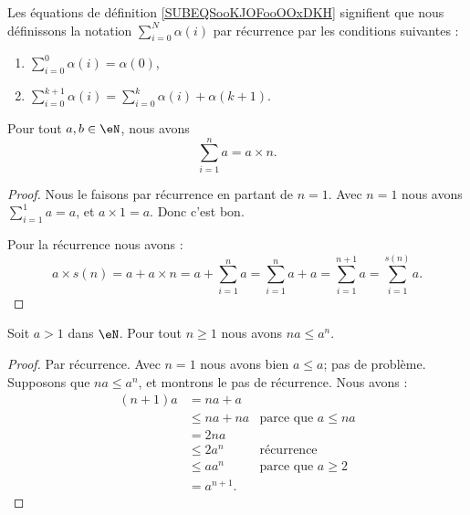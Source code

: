 \begin{normaltext}	\label{NORooNotationSommeNaturels}
	Les équations de définition \eqref{SUBEQSooKJOFooOOxDKH} signifient que nous définissons la notation \( \sum_{i=0}^N\alpha(i)\) par récurrence par les conditions suivantes :
	\begin{enumerate}
		\item       \label{ITEMooIPDTooEhOxea}
		      \( \sum_{i=0}^0\alpha(i)=\alpha(0)\),
		\item	\label{ITEMooSommeNaturelsSucc}
		      \( \sum_{i=0}^{k+1}\alpha(i)=\sum_{i=0}^{k}\alpha(i)+\alpha(k+1)\).
	\end{enumerate}
\end{normaltext}


\begin{proposition}        \label{PROPooXXGHooLafGsI}
	Pour tout \( a,b\in \eN\), nous avons
	\begin{equation}
		\sum_{i=1}^na=a\times n.
	\end{equation}
\end{proposition}

\begin{proof}
	Nous le faisons par récurrence en partant de \( n=1\). Avec \( n=1\) nous avons \( \sum_{i=1}^1 a = a \), et \( a\times 1 = a\). Donc c'est bon.

	Pour la récurrence nous avons :
	\begin{equation}
		a\times s(n)=a + a\times n = a + \sum_{i=1}^n a = \sum_{i=1}^n a + a = \sum_{i=1}^{n+1} a = \sum_{i=1}^{s(n)}a.
	\end{equation}
\end{proof}

\begin{lemma}       \label{LEMooIETGooMyrilW}
	Soit \( a>1\) dans \( \eN\). Pour tout \( n\geq 1\) nous avons \( na\leq a^n\).
\end{lemma}

\begin{proof}
	Par récurrence. Avec \( n=1\) nous avons bien \( a\leq a\); pas de problème. Supposons que \( na\leq a^n\), et montrons le pas de récurrence. Nous avons :
	\begin{subequations}
		\begin{align}
			(n+1)a & =   na+a                                   \\
			       & \leq  na+na  & \text{parce que }  a\leq na \\
			       & =   2na                                    \\
			       & \leq  2a^n   & \text{récurrence}           \\
			       & \leq  aa^n   & \text{parce que } a\geq 2   \\
			       & =   a^{n+1}.
		\end{align}
	\end{subequations}
\end{proof}

